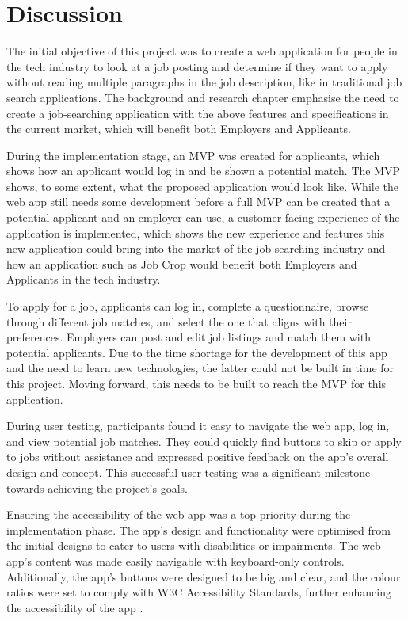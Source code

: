 \chapter{Discussion}
The initial objective of this project was to create a web application for people in the tech industry to look at a job posting and determine if they want to apply without reading multiple paragraphs in the job description, like in traditional job search applications. The background and research chapter emphasise the need to create a job-searching application with the above features and specifications in the current market, which will benefit both Employers and Applicants.

During the implementation stage, an MVP was created for applicants, which shows how an applicant would log in and be shown a potential match. The MVP shows, to some extent, what the proposed application would look like. While the web app still needs some development before a full MVP can be created that a potential applicant and an employer can use, a customer-facing experience of the application is implemented, which shows the new experience and features this new application could bring into the market of the job-searching industry and how an application such as Job Crop would benefit both Employers and Applicants in the tech industry.

To apply for a job, applicants can log in, complete a questionnaire, browse through different job matches, and select the one that aligns with their preferences. Employers can post and edit job listings and match them with potential applicants. Due to the time shortage for the development of this app and the need to learn new technologies, the latter could not be built in time for this project. Moving forward, this needs to be built to reach the MVP for this application. 

During user testing, participants found it easy to navigate the web app, log in, and view potential job matches. They could quickly find buttons to skip or apply to jobs without assistance and expressed positive feedback on the app's overall design and concept. This successful user testing was a significant milestone towards achieving the project's goals.

Ensuring the accessibility of the web app was a top priority during the implementation phase. The app's design and functionality were optimised from the initial designs to cater to users with disabilities or impairments. The web app's content was made easily navigable with keyboard-only controls. Additionally, the app's buttons were designed to be big and clear, and the colour ratios were set to comply with W3C Accessibility Standards, further enhancing the accessibility of the app \parencite{Reference42}.

